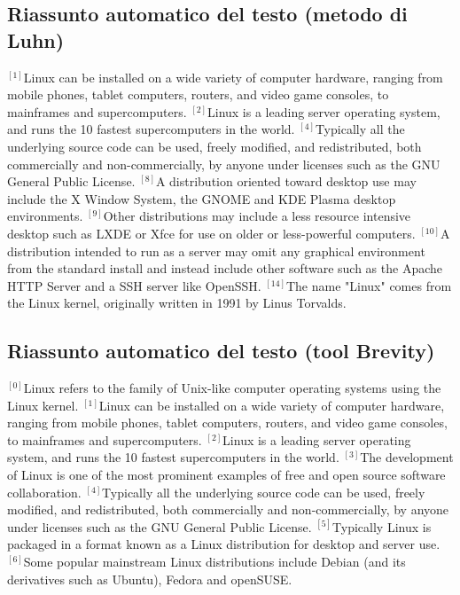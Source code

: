 \subsection*{Riassunto automatico del testo (metodo di Luhn)}
\begin{small}
{$^{[1]}$}Linux can be installed on a wide variety of computer hardware, ranging from mobile phones, tablet computers, routers, and video game consoles, to mainframes and supercomputers.
{$^{[2]}$}Linux is a leading server operating system, and runs the 10 fastest supercomputers in the world.
{$^{[4]}$}Typically all the underlying source code can be used, freely modified, and redistributed, both commercially and non-commercially, by anyone under licenses such as the GNU General Public License.
{$^{[8]}$}A distribution oriented toward desktop use may include the X Window System, the GNOME and KDE Plasma desktop environments.
{$^{[9]}$}Other distributions may include a less resource intensive desktop such as LXDE or Xfce for use on older or less-powerful computers.
{$^{[10]}$}A distribution intended to run as a server may omit any graphical environment from the standard install and instead include other software such as the Apache HTTP Server and a SSH server like OpenSSH.
{$^{[14]}$}The name "Linux" comes from the Linux kernel, originally written in 1991 by Linus Torvalds.
\vfill
\end{small}


\subsection*{Riassunto automatico del testo (tool Brevity)}
\begin{small}
{$^{[0]}$}Linux refers to the family of Unix-like computer operating systems using the Linux kernel. 
{$^{[1]}$}Linux can be installed on a wide variety of computer hardware, ranging from mobile phones, tablet computers, routers, and video game consoles, to mainframes and supercomputers. 
{$^{[2]}$}Linux is a leading server operating system, and runs the 10 fastest supercomputers in the world. 
{$^{[3]}$}The development of Linux is one of the most prominent examples of free and open source software collaboration. 
{$^{[4]}$}Typically all the underlying source code can be used, freely modified, and redistributed, both commercially and non-commercially, by anyone under licenses such as the GNU General Public License. 
{$^{[5]}$}Typically Linux is packaged in a format known as a Linux distribution for desktop and server use. 
{$^{[6]}$}Some popular mainstream Linux distributions include Debian (and its derivatives such as Ubuntu), Fedora and openSUSE.      
\vfill
\end{small}

